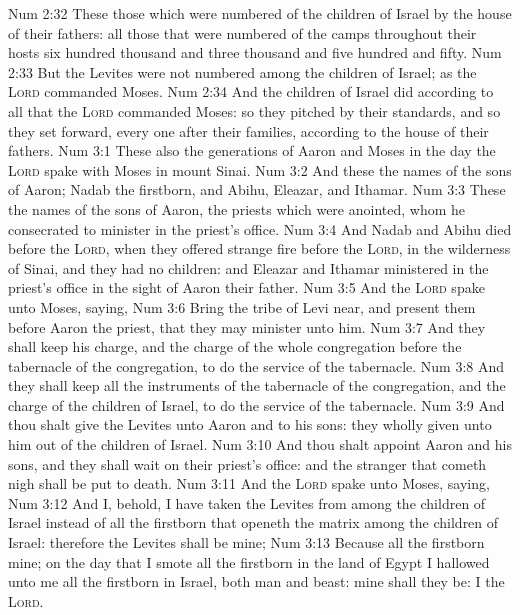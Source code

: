 \vs Num 2:32 These  those which were numbered of the children of Israel by the house of their fathers: all those that were numbered of the camps throughout their hosts  six hundred thousand and three thousand and five hundred and fifty.
\vs Num 2:33 But the Levites were not numbered among the children of Israel; as the \textsc{Lord} commanded Moses.
\vs Num 2:34 And the children of Israel did according to all that the \textsc{Lord} commanded Moses: so they pitched by their standards, and so they set forward, every one after their families, according to the house of their fathers.
\vs Num 3:1 These also  the generations of Aaron and Moses in the day  the \textsc{Lord} spake with Moses in mount Sinai.
\vs Num 3:2 And these  the names of the sons of Aaron; Nadab the firstborn, and Abihu, Eleazar, and Ithamar.
\vs Num 3:3 These  the names of the sons of Aaron, the priests which were anointed, whom he consecrated to minister in the priest's office.
\vs Num 3:4 And Nadab and Abihu died before the \textsc{Lord}, when they offered strange fire before the \textsc{Lord}, in the wilderness of Sinai, and they had no children: and Eleazar and Ithamar ministered in the priest's office in the sight of Aaron their father.
\vs Num 3:5 And the \textsc{Lord} spake unto Moses, saying,
\vs Num 3:6 Bring the tribe of Levi near, and present them before Aaron the priest, that they may minister unto him.
\vs Num 3:7 And they shall keep his charge, and the charge of the whole congregation before the tabernacle of the congregation, to do the service of the tabernacle.
\vs Num 3:8 And they shall keep all the instruments of the tabernacle of the congregation, and the charge of the children of Israel, to do the service of the tabernacle.
\vs Num 3:9 And thou shalt give the Levites unto Aaron and to his sons: they  wholly given unto him out of the children of Israel.
\vs Num 3:10 And thou shalt appoint Aaron and his sons, and they shall wait on their priest's office: and the stranger that cometh nigh shall be put to death.
\vs Num 3:11 And the \textsc{Lord} spake unto Moses, saying,
\vs Num 3:12 And I, behold, I have taken the Levites from among the children of Israel instead of all the firstborn that openeth the matrix among the children of Israel: therefore the Levites shall be mine;
\vs Num 3:13 Because all the firstborn  mine;  on the day that I smote all the firstborn in the land of Egypt I hallowed unto me all the firstborn in Israel, both man and beast: mine shall they be: I  the \textsc{Lord}.
